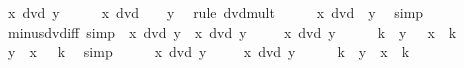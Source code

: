 \begin{isabellebody}
\ {\isachardoublequoteopen}x\ dvd\ y{\isachardoublequoteclose}\isanewline
\ \ \isamarkupfalse%
\ \isamarkupfalse%
\ {\isachardoublequoteopen}x\ dvd\ {\isacharminus}{\kern0pt}\ {}\ {\isacharasterisk}{\kern0pt}\ y{\isachardoublequoteclose}\ \isamarkupfalse%
\ {\isacharparenleft}{\kern0pt}rule\ dvd{\isacharunderscore}{\kern0pt}mult{\isacharparenright}{\kern0pt}\isanewline
\ \ \isamarkupfalse%
\ \isamarkupfalse%
\ {\isachardoublequoteopen}x\ dvd\ {\isacharminus}{\kern0pt}\ y{\isachardoublequoteclose}\ \isamarkupfalse%
\ simp\isanewline
{}\isamarkupfalse%
%
\endisatagproof
{\isafoldproof}%
%
\isadelimproof
\isanewline
%
\endisadelimproof
\isanewline
{}\isamarkupfalse%
\ minus{\isacharunderscore}{\kern0pt}dvd{\isacharunderscore}{\kern0pt}iff\ {\isacharbrackleft}{\kern0pt}simp{\isacharbrackright}{\kern0pt}{\isacharcolon}{\kern0pt}\ {\isachardoublequoteopen}{\isacharminus}{\kern0pt}\ x\ dvd\ y\ {\isasymlongleftrightarrow}\ x\ dvd\ y{\isachardoublequoteclose}\isanewline
%
\isadelimproof
%
\endisadelimproof
%
\isatagproof
{}\isamarkupfalse%
\isanewline
\ \ \isamarkupfalse%
\ {\isachardoublequoteopen}{\isacharminus}{\kern0pt}\ x\ dvd\ y{\isachardoublequoteclose}\isanewline
\ \ \isamarkupfalse%
\ \isamarkupfalse%
\ k\ \ {\isachardoublequoteopen}y\ {\isacharequal}{\kern0pt}\ {\isacharminus}{\kern0pt}\ x\ {\isacharasterisk}{\kern0pt}\ k{\isachardoublequoteclose}\ \isacommand{{\isachardot}{\kern0pt}{\isachardot}{\kern0pt}}\isamarkupfalse%
\isanewline
\ \ \isamarkupfalse%
\ \isamarkupfalse%
\ {\isachardoublequoteopen}y\ {\isacharequal}{\kern0pt}\ x\ {\isacharasterisk}{\kern0pt}\ {\isacharminus}{\kern0pt}\ k{\isachardoublequoteclose}\ \isamarkupfalse%
\ simp\isanewline
\ \ \isamarkupfalse%
\ \isamarkupfalse%
\ {\isachardoublequoteopen}x\ dvd\ y{\isachardoublequoteclose}\ \isacommand{{\isachardot}{\kern0pt}{\isachardot}{\kern0pt}}\isamarkupfalse%
\isanewline
{}\isamarkupfalse%
\isanewline
\ \ \isamarkupfalse%
\ {\isachardoublequoteopen}x\ dvd\ y{\isachardoublequoteclose}\isanewline
\ \ \isamarkupfalse%
\ \isamarkupfalse%
\ k\ \ {\isachardoublequoteopen}y\ {\isacharequal}{\kern0pt}\ x\ {\isacharasterisk}{\kern0pt}\ k{\isachardoublequoteclose}\ \isacommand{{\isachardot}{\kern0pt}{\isachardot}{\kern0pt}}\isamarkupfalse%

\end{isabellebody}
